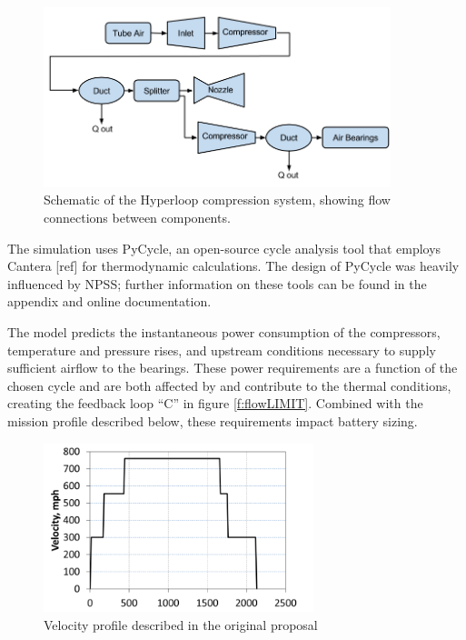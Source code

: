 \documentclass[heading.tex]{subfiles}
\begin{document}
\begin{figure}[hbtp]
\centering
\includegraphics[width=0.9\textwidth]{images/compressor_schematic.png}
\caption{Schematic of the Hyperloop compression system, showing flow connections between components.}
\label{f:comp}
\end{figure}


The simulation uses PyCycle, an open-source cycle analysis tool that employs Cantera [ref] for thermodynamic calculations. The design of PyCycle was heavily influenced by NPSS;
further information on these tools can be found in the appendix and online documentation. \cite{goodwin2009cantera}

The model predicts the instantaneous power consumption of the compressors, temperature and pressure rises,
and upstream conditions necessary to supply sufficient airflow to the bearings.
These power requirements are a function of the chosen cycle and are both affected by
and contribute to the thermal conditions, creating the feedback loop “C” in figure \ref{f:flowLIMIT}.
Combined with the mission profile described below, these requirements impact battery sizing.

\begin{figure}[hbtp]
\centering
\includegraphics[width=0.7\textwidth]{images/velocity_profile.png}
\caption{Velocity profile described in the original proposal}
\label{f:velocity}
\end{figure}
\end{document}
